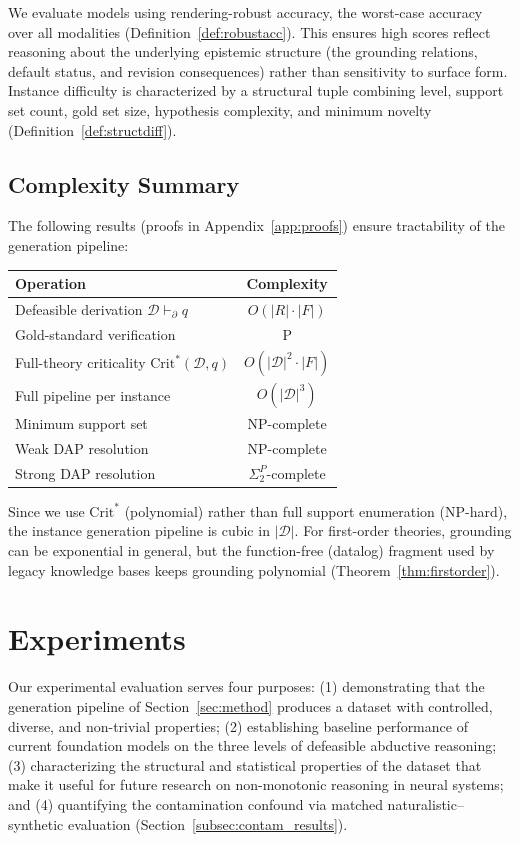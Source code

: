 \documentclass{article}
\theoremstyle{definition}
\newcommand{\D}{\mathcal{D}}
\newcommand{\CritStar}{\mathrm{Crit}^{*}}
\newcommand{\pPartial}{\vdash_{\partial}}
\begin{document}
We evaluate models using rendering-robust accuracy, the worst-case accuracy over all modalities (Definition~\ref{def:robustacc}). This ensures high scores reflect reasoning about the underlying epistemic structure (the grounding relations, default status, and revision consequences) rather than sensitivity to surface form. Instance difficulty is characterized by a structural tuple combining level, support set count, gold set size, hypothesis complexity, and minimum novelty (Definition~\ref{def:structdiff}).


\subsection{Complexity Summary}\label{subsec:complexity}

The following results (proofs in Appendix~\ref{app:proofs}) ensure tractability of the generation pipeline:

\begin{center}
\begin{tabular}{@{}lc@{}}
\toprule
Operation & Complexity \\
\midrule
Defeasible derivation $\D \pPartial q$ & $O(|R| \cdot |F|)$ \\
Gold-standard verification & P \\
Full-theory criticality $\CritStar(\D, q)$ & $O(|\D|^2 \cdot |F|)$ \\
Full pipeline per instance & $O(|\D|^3)$ \\
Minimum support set & NP-complete \\
Weak DAP resolution & NP-complete \\
Strong DAP resolution & $\Sigma_2^P$-complete \\
\bottomrule
\end{tabular}
\end{center}

Since we use $\CritStar$ (polynomial) rather than full support enumeration (NP-hard), the instance generation pipeline is cubic in $|\D|$. For first-order theories, grounding can be exponential in general, but the function-free (datalog) fragment used by legacy knowledge bases keeps grounding polynomial (Theorem~\ref{thm:firstorder}).


\section{Experiments}\label{sec:experiments}

Our experimental evaluation serves four purposes: (1) demonstrating that the generation pipeline of Section~\ref{sec:method} produces a dataset with controlled, diverse, and non-trivial properties; (2) establishing baseline performance of current foundation models on the three levels of defeasible abductive reasoning; (3) characterizing the structural and statistical properties of the dataset that make it useful for future research on non-monotonic reasoning in neural systems; and (4) quantifying the contamination confound via matched naturalistic--synthetic evaluation (Section~\ref{subsec:contam_results}).
\end{document}
